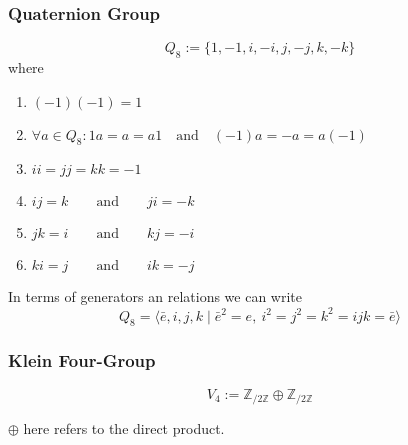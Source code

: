 \subsubsection{Quaternion Group}
\begin{definition}
   \[Q_8 := \{1, -1, i, -i, j, -j, k, -k\}\]
   where
   \begin{enumerate}%
      \item \((-1)(-1) = 1\)
      \item \(\forall a \in Q_8: 1a = a = a1 \quad\text{and}\quad (-1)a = -a = a(-1)\)
      \item \(ii = jj = kk = -1\)
      \item \(ij = k \qquad\text{and}\qquad ji = -k\)
      \item \(jk = i \qquad\text{and}\qquad kj = -i\)
      \item \(ki = j \qquad\text{and}\qquad ik = -j\)
   \end{enumerate}
\end{definition}
\begin{remark}
   In terms of generators an relations we can write
   \[Q_8 = \langle \bar{e},i,j,k \mid \bar{e}^{2} = e,~ i^2 = j^2 = k^2 = ijk = \bar{e}\rangle\]
\end{remark}

\subsubsection{Klein Four-Group}
\begin{definition}
   \[V_4 := \mathbb{Z}_{/2\mathbb{Z}} \oplus \mathbb{Z}_{/2\mathbb{Z}}\]
\end{definition}
\begin{remark}
   \(\oplus\) here refers to the direct product.
\end{remark}

\newpage

